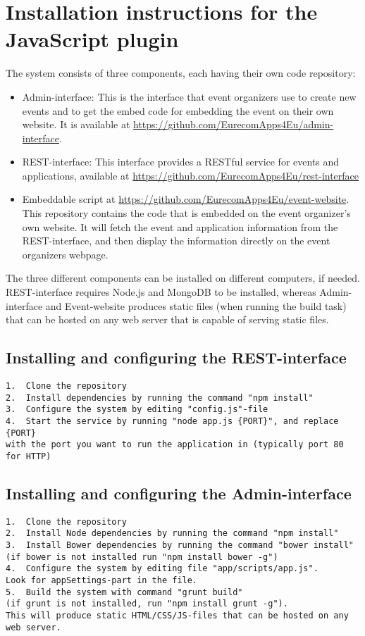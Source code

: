 \chapter{Installation instructions for the JavaScript plugin}
\label{ch:appendixA}

The system consists of three components, each having their own code repository:
\begin{itemize}
\item Admin-interface: This is the interface that event organizers use to create new events and to get the embed code for embedding the event on their own website. It is available at \url{https://github.com/EurecomApps4Eu/admin-interface}. 	
\item REST-interface: This interface provides a RESTful service for events and applications, available at \url{https://github.com/EurecomApps4Eu/rest-interface} 
\item Embeddable script at \url{https://github.com/EurecomApps4Eu/event-website}. This repository contains the code that is embedded on the event organizer's own website. It will fetch the event and application information from the REST-interface, and then display the information directly on the event organizers webpage.
\end{itemize}

The three different components can be installed on different computers, if needed. REST-interface requires Node.js and MongoDB to be installed, whereas Admin-interface and Event-website produces static files (when running the build task) that can be hosted on any web server that is capable of serving static files.

\section{Installing and configuring the REST-interface}
\begin{verbatim}
1.	Clone the repository
2.	Install dependencies by running the command "npm install"
3.	Configure the system by editing "config.js"-file
4.	Start the service by running "node app.js {PORT}", and replace {PORT} 
with the port you want to run the application in (typically port 80 for HTTP)

\end{verbatim}

\section{Installing and configuring the Admin-interface}
\begin{verbatim}
1.	Clone the repository
2.	Install Node dependencies by running the command "npm install"
3.	Install Bower dependencies by running the command "bower install" 
(if bower is not installed run "npm install bower -g")
4.	Configure the system by editing file "app/scripts/app.js". 
Look for appSettings-part in the file.
5.	Build the system with command "grunt build" 
(if grunt is not installed, run "npm install grunt -g").
This will produce static HTML/CSS/JS-files that can be hosted on any web server.
\end{verbatim}

